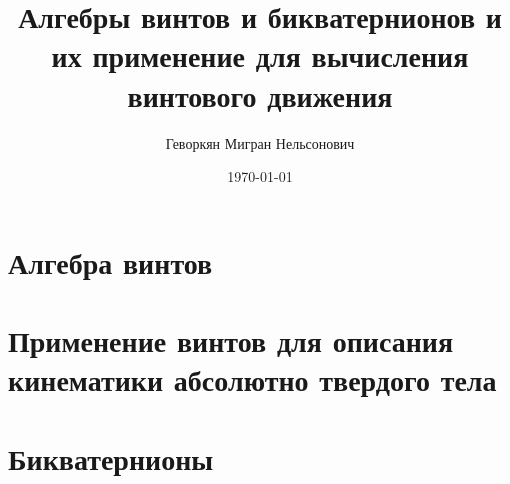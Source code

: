 
\title[Алгебры винтов и бикватернионов]{Алгебры винтов и бикватернионов и их применение для вычисления винтового движения}
          
\author[Геворкян М. Н.]{Геворкян Мигран Нельсонович}  
\date{\today}



  

  \section{Алгебра винтов}
  \newrefsection
  
  

  \section{Применение винтов для описания кинематики абсолютно твердого тела}
  \newrefsection
  
  

  \section{Бикватернионы}
  \newrefsection
  
  

